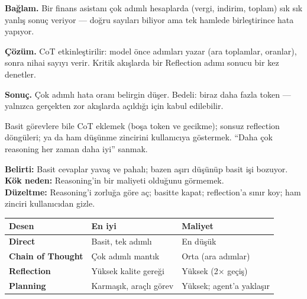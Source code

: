 \begin{prodbox}
\textbf{Bağlam.} Bir finans asistanı çok adımlı hesaplarda (vergi, indirim, toplam)
sık sık yanlış sonuç veriyor --- doğru sayıları biliyor ama tek hamlede birleştirince
hata yapıyor.

\smallskip
\textbf{Çözüm.} CoT etkinleştirilir: model önce adımları yazar (ara toplamlar,
oranlar), sonra nihai sayıyı verir. Kritik akışlarda bir Reflection adımı
sonucu bir kez denetler.

\smallskip
\textbf{Sonuç.} Çok adımlı hata oranı belirgin düşer. Bedeli: biraz daha fazla
token --- yalnızca gerçekten zor akışlarda açıldığı için kabul edilebilir.
\end{prodbox}

\begin{antibox}
Basit görevlere bile CoT eklemek (boşa token ve gecikme); sonsuz reflection
döngüleri; ya da ham düşünme zincirini kullanıcıya göstermek. ``Daha çok reasoning
her zaman daha iyi'' sanmak.

\smallskip
\textbf{Belirti:} Basit cevaplar yavaş ve pahalı; bazen aşırı düşünüp basit işi bozuyor.\\
\textbf{Kök neden:} Reasoning'in bir maliyeti olduğunu görmemek.\\
\textbf{Düzeltme:} Reasoning'i zorluğa göre aç; basitte kapat; reflection'a sınır koy; ham zinciri kullanıcıdan gizle.
\end{antibox}

\vspace{2pt}
\begin{tabularx}{\linewidth}{@{}>{\raggedright\arraybackslash}p{26mm} L L@{}}
\toprule
{\sffamily\bfseries\small Desen} & {\sffamily\bfseries\small En iyi} & {\sffamily\bfseries\small Maliyet} \\
\midrule
\textbf{Direct} & Basit, tek adımlı & En düşük \\
\addlinespace[2pt]
\textbf{Chain of Thought} & Çok adımlı mantık & Orta (ara adımlar) \\
\addlinespace[2pt]
\textbf{Reflection} & Yüksek kalite gereği & Yüksek (2× geçiş) \\
\addlinespace[2pt]
\textbf{Planning} & Karmaşık, araçlı görev & Yüksek; agent'a yaklaşır \\
\bottomrule
\end{tabularx}

